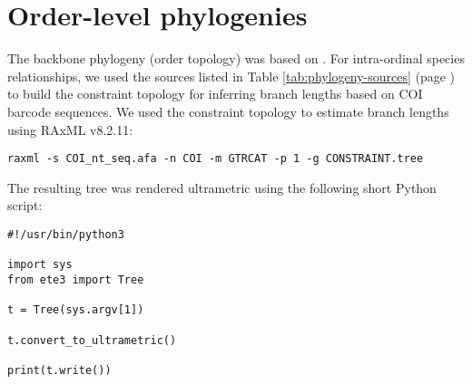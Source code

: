 \clearpage

\section{Order-level phylogenies}

The backbone phylogeny (order topology) was based on \citet{Misof2014}. For intra-ordinal species relationships, we used the sources listed in Table \ref{tab:phylogeny-sources} (page \pageref{tab:phylogeny-sources}) to build the constraint topology for inferring branch lengths based on COI barcode sequences. We used the constraint topology to estimate branch lengths using RAxML v8.2.11:

\begin{verbatim}
raxml -s COI_nt_seq.afa -n COI -m GTRCAT -p 1 -g CONSTRAINT.tree
\end{verbatim}

\begin{minipage}{\linewidth}
The resulting tree was rendered ultrametric using the following short Python script:

\begin{verbatim}
#!/usr/bin/python3

import sys
from ete3 import Tree

t = Tree(sys.argv[1])

t.convert_to_ultrametric()

print(t.write())
\end{verbatim}
\end{minipage}


